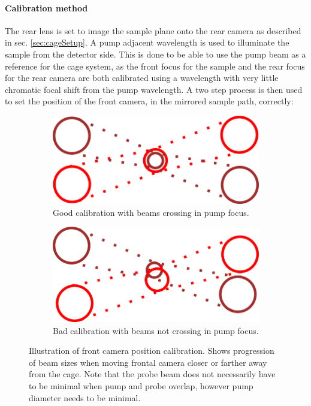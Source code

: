 \documentclass[twoside,openright,listof=numbered]{scrreprt}
\begin{document}
\paragraph{Calibration method}
The rear lens is set to image the sample plane onto the rear camera as described in sec. \ref{sec:cageSetup}. A pump adjacent wavelength is used to illuminate the sample from the detector side. This is done to be able to use the pump beam as a reference for the cage system, as the front focus for the sample and the rear focus for the rear camera are both calibrated using a wavelength with very little chromatic focal shift from the pump wavelength. A two step process is then used to set the position of the front camera, in the mirrored sample path, correctly:
\begin{figure}[hbtp]
\centering
\begin{subfigure}[b]{0.5\linewidth}
\centering
\includegraphics[scale=1]{images/ArtrayCalibrationIllustration_Good.png}
\caption{Good calibration with beams crossing in pump focus.}
\end{subfigure}\hfill
\begin{subfigure}[b]{0.5\linewidth}
\centering
\includegraphics[scale=1]{images/ArtrayCalibrationIllustration_Bad.png}
\caption{Bad calibration with beams not crossing in pump focus.}
\end{subfigure}
\caption[Illustration of front camera position calibration.]{Illustration of front camera position calibration. Shows progression of beam sizes when moving frontal camera closer or farther away from the cage. Note that the probe beam does not necessarily have to be minimal when pump and probe overlap, however pump diameter needs to be minimal.\label{fig:calibrationArtrayIllustration}}
\end{figure}
\end{document}
